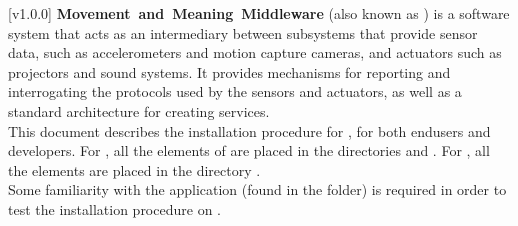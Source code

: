 [v1.0.0]
\textbf{Movement~and~Meaning~Middleware} (also known as \mplusm) is a software system
that acts as an intermediary between subsystems that provide sensor data, such as
accelerometers and motion capture cameras, and actuators such as projectors and sound
systems.
It provides mechanisms for reporting and interrogating the protocols used by the sensors
and actuators, as well as a standard architecture for creating services.\\

This document describes the installation procedure for \mplusm, for both
end\longDash{}users and developers.
For \mac, all the elements of \mplusm{} are placed in the directories 
and .
For \win, all the elements are placed in the directory
.\\

Some familiarity with the  application (found in the
 folder) is required in order to test the installation
procedure on \mac.
\primaryEnd{}

